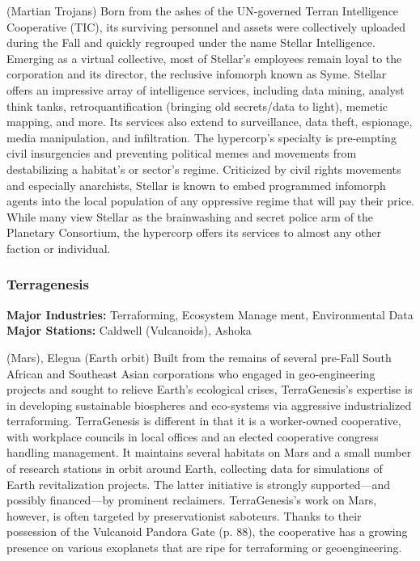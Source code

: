 (Martian Trojans)
Born from the ashes of the UN-governed Terran Intelligence Cooperative (TIC), its surviving personnel and 
assets were collectively uploaded during the Fall and 
quickly regrouped under the name Stellar Intelligence. 
Emerging as a virtual collective, most of Stellar's employees remain loyal to the corporation and its director, the reclusive infomorph known as Syme. Stellar 
offers an impressive array of intelligence services, 
including data mining, analyst think tanks, retroquantification (bringing old secrets/data to light), 
memetic mapping, and more. Its services also extend 
to surveillance, data theft, espionage, media manipulation, and infiltration. The hypercorp's specialty is 
pre-empting civil insurgencies and preventing political 
memes and movements from destabilizing a habitat's 
or sector's regime. Criticized by civil rights movements 
and especially anarchists, Stellar is known to embed 
programmed infomorph agents into the local population of any oppressive regime that will pay their 
price. While many view Stellar as the brainwashing 
and secret police arm of the Planetary Consortium, 
the hypercorp offers its services to almost any other 
faction or individual.

\subsubsection{Terragenesis}

\textbf{Major Industries:} Terraforming, Ecosystem Manage
ment, Environmental Data
\textbf{Major Stations:} Caldwell (Vulcanoids), Ashoka 

(Mars), Elegua (Earth orbit)
Built from the remains of several pre-Fall South African and Southeast Asian corporations who engaged 
in geo-engineering projects and sought to relieve 
Earth's ecological crises, TerraGenesis's expertise is in 
developing sustainable biospheres and eco-systems via 
aggressive industrialized terraforming. TerraGenesis 
is different in that it is a worker-owned cooperative, 
with workplace councils in local offices and an elected 
cooperative congress handling management. It maintains several habitats on Mars and a small number of 
research stations in orbit around Earth, collecting data 
for simulations of Earth revitalization projects. The 
latter initiative is strongly supported—and possibly 
financed—by prominent reclaimers. TerraGenesis's 
work on Mars, however, is often targeted by preservationist saboteurs. Thanks to their possession of the 
Vulcanoid Pandora Gate (p. 88), the cooperative has a 
growing presence on various exoplanets that are ripe 
for terraforming or geoengineering.

